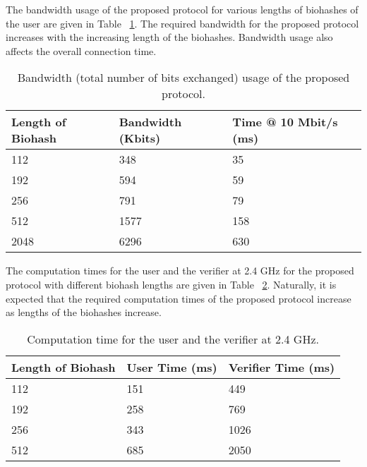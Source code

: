 \documentclass[journal]{IEEEtran}
\begin{document}
The bandwidth usage of the proposed protocol for various lengths of biohashes of the user are given in Table ~\ref{bandwidth}. The required bandwidth for the proposed protocol increases with the increasing length of the biohashes. Bandwidth usage also affects the overall connection time.

\begin{table}[h]
\caption{Bandwidth (total number of bits exchanged) usage of the proposed protocol.}
\label{bandwidth}
   \begin{tabular}{|p{2.3cm}|p{2.3cm}|p{2.8cm}|} \hline
    Length of Biohash  & Bandwidth (Kbits) &                Time @ 10 Mbit/s (ms) \\ \hline
    112                & 348               & 35                                   \\ \hline
    192                & 594               & 59                                   \\ \hline
    256                & 791               & 79                                   \\ \hline
    512                & 1577              & 158                                  \\ \hline
    2048              & 6296              & 630                                  \\ \hline
    \end{tabular}
\end{table}

The computation times for the user and the verifier at 2.4 GHz for the proposed protocol with different biohash lengths are given in Table ~\ref{user_time1}. Naturally, it is expected that the required computation times of the proposed protocol increase as lengths of the biohashes increase.

\begin{table}[h]
    \caption{Computation time for the user and the verifier at 2.4 GHz.}
\label{user_time1}
\begin{tabular}{|p{2.3cm}|p{2.5cm}|p{2.5cm}|}
    \hline
    Length of Biohash & User Time (ms) & Verifier Time (ms) \\ \hline
    112               & 151                          & 449                       \\ \hline
    192               & 258                          & 769                       \\ \hline
    256               & 343                          & 1026                       \\ \hline
    512               & 685                          & 2050                     \\ \hline
    \end{tabular}
\end{table}
\end{document}
